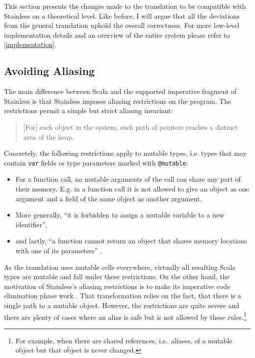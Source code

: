 This section presents the changes made to the translation to be compatible with
Stainless on a theoretical level. Like before, I will argue  that all the
deviations from the general translation uphold the overall correctness. For more
low-level implementation details and an overview of the entire system please
refer to \autoref{implementation}.



\subsection{Avoiding Aliasing}
\label{sec:aliasing-restrictions}

The main difference between Scala and the supported imperative fragment of
Stainless \cite[section ``Imperative'']{stainless-doc} is that Stainless imposes
aliasing restrictions on the program. The restrictions permit a simple but
strict aliasing invariant:

\begin{quote}
{[}For{]} each object in the system, each path of pointers reaches a
distinct area of the heap. \cite[p.~59]{regb}
\end{quote}

Concretely, the following restrictions apply to mutable types, i.e. types that
may contain \lstinline!var! fields or type parameters marked with
\lstinline!@mutable!:

\begin{itemize}
\tightlist
\item
  For a function call, no mutable arguments of the call can share any
  part of their memory. E.g. in a function call it is not allowed to
  give an object as one argument and a field of the same object as
  another argument.
\item
  More generally, ``it is forbidden to assign a mutable variable to a
  new identifier'',
\item
  and lastly, ``a function cannot return an object that shares memory
  locations with one of its parameters'' \cite[p.~59]{regb}.
\end{itemize}

As the translation uses mutable cells everywhere, virtually all resulting Scala
types are mutable and fall under these restrictions. On the other hand, the
motivation of Stainless's aliasing restrictions is to make its imperative code
elimination phase work \cite{regb}. That transformation relies on the fact, that
there is a single path to a mutable object. However, the restrictions are quite
severe and there are plenty of cases where an alias is safe but is not allowed
by these rules.\footnote{For example, when there are shared references,
i.e.~aliases, of a mutable object but that object is never changed.}

